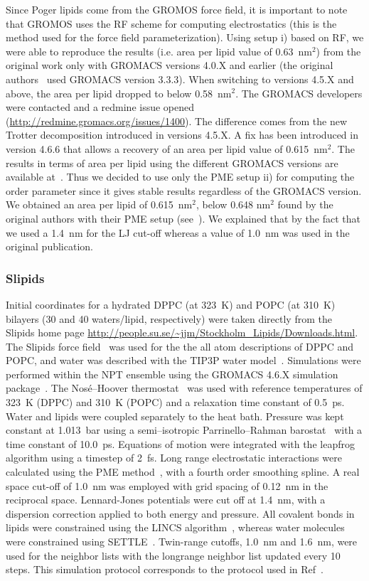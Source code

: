 \documentclass[journal=jacsat,manuscript=article]{achemso}
\begin{document}
Since Poger lipids come from the GROMOS force field, it is important to note that GROMOS uses the RF scheme for computing electrostatics (this is the method used for the 
force field parameterization). Using setup i) based on RF, we were able to reproduce the results (i.e. area per lipid value of 0.63~nm$^2$) from the original work only with 
GROMACS versions 4.0.X and earlier (the original authors~\cite{poger10} used GROMACS version 3.3.3). When switching to versions 4.5.X and above, the area per lipid dropped to below 0.58~nm$^2$. 
The GROMACS developers were contacted and a redmine issue opened (\url{http://redmine.gromacs.org/issues/1400}). The difference comes from the new Trotter decomposition 
introduced in versions 4.5.X. A fix has been introduced in version 4.6.6 that allows a recovery of an area per lipid value of 0.615~nm$^2$. The results in terms of area per lipid using the different 
GROMACS versions are available at~\cite{pogerFILESrf2}.
Thus we decided to use only the PME setup ii) for computing the order parameter since it gives stable results regardless of the GROMACS version. We obtained an area per 
lipid of 0.615~nm$^2$, below 0.648 nm$^2$ found by the original authors with their PME setup (see~\cite{poger12}). We explained that by the fact that we used 
a 1.4~nm for the LJ cut-off whereas a value of 1.0~nm was used in the original publication. 

\subsubsection{Slipids}
Initial coordinates for a hydrated DPPC (at 323~K) and POPC (at 310~K) bilayers (30 and 40 waters/lipid, respectively) were taken directly from the 
Slipids home page \url{http://people.su.se/\~jjm/Stockholm\_Lipids/Downloads.html}.  The Slipids force field~\cite{jambeck12,jambeck12b} was used for the the all atom descriptions of DPPC and POPC, and
water was described with the TIP3P water model~\cite{jorgensen83}. Simulations were performed within the NPT ensemble using the GROMACS 4.6.X simulation
package~\cite{hess08}. The Nos\'{e}--Hoover thermostat~\cite{nose84,hoover85} was used with reference temperatures of
323~K (DPPC) and 310~K (POPC) and a relaxation time constant of 0.5~ps. Water and lipids were coupled separately to
the heat bath. Pressure was kept constant at 1.013~bar using a semi--isotropic Parrinello--Rahman
barostat~\cite{parrinello81} with a time constant of 10.0~ps. Equations of motion were
integrated with the leapfrog algorithm using a timestep of 2~fs. Long range
electrostatic interactions were calculated using the PME method~\cite{darden93,essman95}, with a fourth order
smoothing spline. A real space cut-off of 1.0~nm was employed with grid spacing of 0.12~nm in the reciprocal space.
Lennard-Jones potentials were cut off at 1.4~nm, with a dispersion correction applied to both energy and pressure. All covalent bonds in lipids were constrained using the LINCS algorithm~\cite{hess97}, 
whereas water molecules were constrained using SETTLE~\cite{miyamoto92}. Twin-range cutoffs,
1.0~nm and 1.6~nm, were used for the neighbor lists with the longrange neighbor list updated every
10 steps. This simulation protocol corresponds to the protocol used in Ref~\cite{jambeck13}. 
\end{document}
